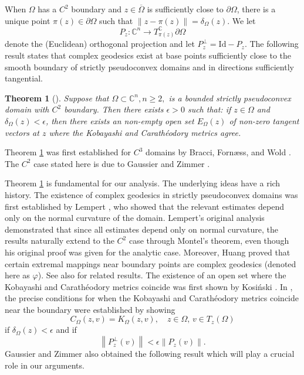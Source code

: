 \documentclass[12pt] {article}
\newtheorem{theorem}{Theorem}[section]
\numberwithin{equation}{section}
\newcommand{\norm}[1]{\left\lVert#1\right\rVert}
\begin{document}
\medskip

When $\Omega$ has a $C^2$ boundary and $z \in \overline{\Omega}$ is sufficiently close to $\partial \Omega$, there is a unique point $\pi(z) \in \partial \Omega$ such that $\|z - \pi(z)\| = \delta_\Omega(z)$. We let
$$
P_z : \mathbb{C}^n \rightarrow T_{\pi(z)}^{\mathbb{C}} \partial \Omega
$$
denote the (Euclidean) orthogonal projection and let $P_z^{\bot} = \text{Id} - P_z$. The following result states that complex geodesics exist at base points sufficiently close to the smooth boundary of strictly pseudoconvex domains and in directions sufficiently tangential.




\medskip




\begin{theorem}[\cite{BFW19, GZ}] \label{local}
Suppose that $\Omega \subset \mathbb C^n, n \ge 2,$ is a bounded strictly pseudoconvex domain with $C^2$ boundary. 
Then 
 there exists $\epsilon > 0$ such that: if $z \in \Omega$ and $\delta_\Omega(z) < \epsilon$, then there exists an non-empty open set $E_\Omega(z)$ of non-zero tangent vectors at $z$ where the Kobayashi and Carath\'eodory metrics agree.

   \end{theorem} 


\medskip

Theorem \ref{local} was first established for $C^3$ domains by Bracci, Forn{\ae}ss, and Wold \cite{BFW19}. The $C^2$ case stated here is due to Gaussier and Zimmer \cite{GZ}.


\medskip


Theorem \ref{local} is fundamental for our analysis. The underlying ideas have a rich history. The existence of complex geodesics in strictly pseudoconvex domains was first established by Lempert \cite{Lem84},  
who showed that the relevant estimates depend only on the normal curvature of the domain.  Lempert's original analysis demonstrated that since all estimates depend only on normal curvature, the results naturally extend to the $C^2$ case through Montel's theorem, even though his original proof was given for the analytic case.
Moreover, Huang \cite{H94} proved that certain extremal mappings near boundary points are complex geodesics (denoted here as $\varphi$). See also \cite{BK1994, Ber} for related results. 
The existence of an open set where the Kobayashi and Carath\'eodory metrics coincide was first shown by Kosi{\'n}ski \cite{Ko}. 
In \cite[Theorem 1.1]{BFW19},  the precise conditions 
for when the Kobayashi and Carath\'eodory metrics coincide near the boundary were established by showing
 $$
 {C_{\Omega}(z, v)} = {K_{\Omega}(z, v)}, \quad z \in \Omega, \,  v\in T_z(\Omega)       
 $$
 if $\delta_\Omega(z) < \epsilon$ 
 and if
 $$
\norm{P_z^{\bot}(v)} < \epsilon \norm{P_z(v)}.
$$  
Gaussier and Zimmer \cite{GZ}   also obtained the following result which will play a crucial role in our arguments.
\end{document}
